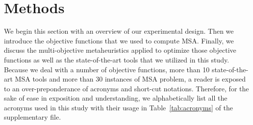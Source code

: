 \section{Methods}
\label{sec:methods}
We begin this section with an overview of our experimental design. Then we introduce the objective functions that we used to compute MSA. Finally, we discuss the multi-objective metaheuristics applied to optimize those objective functions as well as the state-of-the-art tools that we utilized in this study. Because we deal with a number of objective functions, more than 10 state-of-the-art MSA tools and more than 30 instances of MSA problem, a reader is exposed to an over-preponderance of acronyms and short-cut notations. Therefore, for the sake of ease in exposition and understanding, we alphabetically list all the acronyms used in this study with their usage in Table~\ref{tab:acronyms} of the supplementary file.

